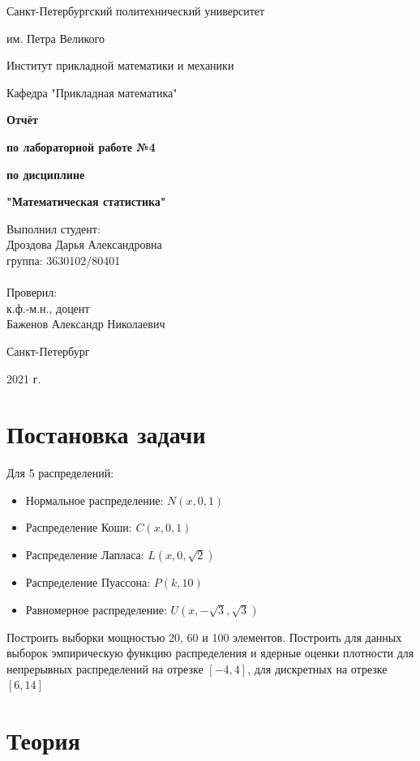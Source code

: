 \documentclass{article}
\begin{document}
\begin{titlepage}
  \centerline {Санкт-Петербургский политехнический университет}
  \centerline { им. Петра Великого}
  \centerline { }
  \centerline {Институт прикладной математики и механики} 
  \centerline {Кафедра "Прикладная математика"}
  \vfill
  \centerline{\textbf{Отчёт}}
  \centerline{\textbf{по лабораторной работе №4}}
  \centerline{\textbf{по дисциплине}}
  \centerline{\textbf{"Математическая статистика"}}
  \vfill
  \hfill
  \begin{minipage}{0.45\textwidth}
  Выполнил студент:\\
  Дроздова Дарья Александровна\\
  группа: 3630102/80401 \\
  \\
  Проверил:\\
  к.ф.-м.н., доцент \\
  Баженов Александр Николаевич
  \end{minipage}
  \vfill
  \centerline {Санкт-Петербург}   
  \centerline {2021 г.}  
\end{titlepage}

\newpage
\setcounter{page}{2}
\tableofcontents

\newpage
\listoffigures

\newpage
\section{Постановка задачи}
Для 5 распределений:
\begin{itemize}
	\item Нормальное распределение: $N(x,0,1)$
    \item Распределение Коши: $C(x,0,1)$
    \item Распределение Лапласа: $L(x,0,\sqrt{2})$
    \item Распределение Пуассона: $P(k,10)$
    \item Равномерное распределение: $U(x,-\sqrt{3}, \sqrt{3})$
\end{itemize}
Построить выборки мощностью 20, 60 и 100 элементов. Построить для данных выборок эмпирическую функцию распределения и ядерные оценки плотности для непрерывных распределений на отрезке $[-4,4]$, для дискретных на отрезке $[6,14]$

\newpage
\section{Теория}
\end{document}
